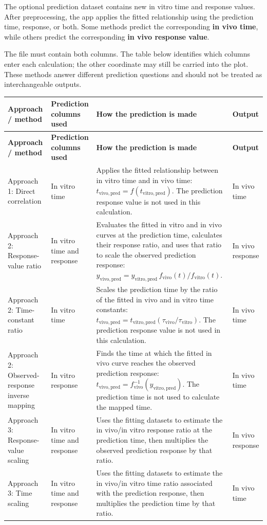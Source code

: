 The optional prediction dataset contains new in vitro time and response values. After preprocessing, the app applies the fitted relationship using the prediction time, response, or both. Some methods predict the corresponding \textbf{in vivo time}, while others predict the corresponding \textbf{in vivo response value}.

The file must contain both columns. The table below identifies which columns enter each calculation; the other coordinate may still be carried into the plot. These methods answer different prediction questions and should not be treated as interchangeable outputs.

\begin{longtable}{@{}>{\raggedright\arraybackslash}p{}>{\raggedright\arraybackslash}p{}>{\raggedright\arraybackslash}p{}>{\raggedright\arraybackslash}p{}@{}}
\toprule
\textbf{Approach / method} & \textbf{Prediction columns used} & \textbf{How the prediction is made} & \textbf{Output} \\
\midrule
\endfirsthead
\toprule
\textbf{Approach / method} & \textbf{Prediction columns used} & \textbf{How the prediction is made} & \textbf{Output} \\
\midrule
\endhead
Approach 1: Direct correlation & In vitro time & Applies the fitted relationship between in vitro time and in vivo time: $t_{\mathrm{vivo,pred}}=f(t_{\mathrm{vitro,pred}})$. The prediction response value is not used in this calculation. & In vivo time \\
Approach 2: Response-value ratio & In vitro time and response & Evaluates the fitted in vitro and in vivo curves at the prediction time, calculates their response ratio, and uses that ratio to scale the observed prediction response: $y_{\mathrm{vivo,pred}}=y_{\mathrm{vitro,pred}}\,f_{\mathrm{vivo}}(t)/f_{\mathrm{vitro}}(t)$. & In vivo response \\
Approach 2: Time-constant ratio & In vitro time & Scales the prediction time by the ratio of the fitted in vivo and in vitro time constants: $t_{\mathrm{vivo,pred}}=t_{\mathrm{vitro,pred}}(\tau_{\mathrm{vivo}}/\tau_{\mathrm{vitro}})$. The prediction response value is not used in this calculation. & In vivo time \\
Approach 2: Observed-response inverse mapping & In vitro response & Finds the time at which the fitted in vivo curve reaches the observed prediction response: $t_{\mathrm{vivo,pred}}=f_{\mathrm{vivo}}^{-1}(y_{\mathrm{vitro,pred}})$. The prediction time is not used to calculate the mapped time. & In vivo time \\
Approach 3: Response-value scaling & In vitro time and response & Uses the fitting datasets to estimate the in vivo/in vitro response ratio at the prediction time, then multiplies the observed prediction response by that ratio. & In vivo response \\
Approach 3: Time scaling & In vitro time and response & Uses the fitting datasets to estimate the in vivo/in vitro time ratio associated with the prediction response, then multiplies the prediction time by that ratio. & In vivo time \\
\bottomrule
\end{longtable}

